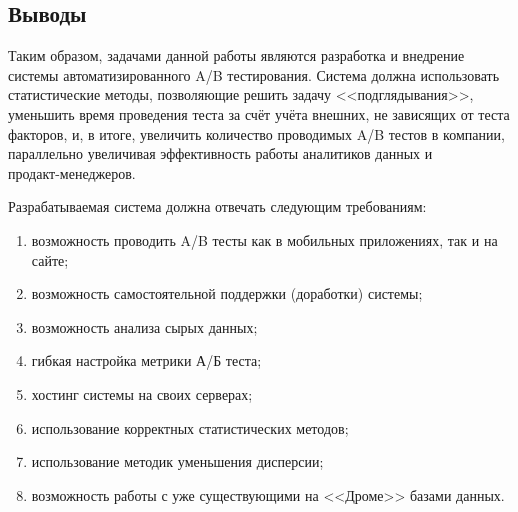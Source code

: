 \documentclass[../document.tex]{subfiles}
\begin{document}
	\subsection{Выводы}
	\par Таким образом, задачами данной работы являются разработка и внедрение системы автоматизированного A/B тестирования. Система должна использовать статистические методы, позволяющие решить задачу <<подглядывания>>, уменьшить время проведения теста за счёт учёта внешних, не зависящих от теста факторов, и, в итоге, увеличить количество проводимых A/B тестов в компании, параллельно увеличивая эффективность работы аналитиков данных и \\продакт-менеджеров.
	\par Разрабатываемая система должна отвечать следующим требованиям:
	\begin{enumerate}
		\item возможность проводить A/B тесты как в мобильных приложениях, так и на сайте;
		\item возможность самостоятельной поддержки (доработки) системы;
		\item возможность анализа сырых данных;
		\item гибкая настройка метрики А/Б теста;
		\item хостинг системы на своих серверах;
		\item использование корректных статистических методов;
		\item использование методик уменьшения дисперсии;
		\item возможность работы с уже существующими на <<Дроме>> базами данных.
	\end{enumerate}
\end{document}
